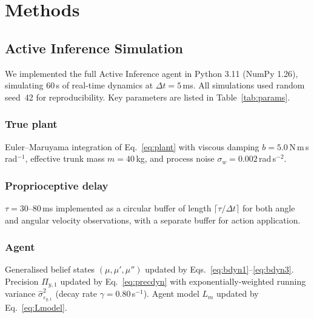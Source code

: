 \documentclass[12pt, letterpaper]{article}
\newcommand{\Piy}{\Pi_{y,1}}
\newcommand{\epsy}{\varepsilon_{y,1}}
\newcommand{\Lm}{L_m}
\begin{document}
\section{Methods}

\subsection{Active Inference Simulation}

We implemented the full Active Inference agent in Python 3.11 (NumPy 1.26),
simulating 60\,s of real-time dynamics at $\Delta t = 5$\,ms. All simulations
used random seed~42 for reproducibility. Key parameters are listed in
Table~\ref{tab:params}.

\subsubsection{True plant}
Euler--Maruyama integration of Eq.~\eqref{eq:plant} with viscous damping
$b = 5.0$\,N\,m\,s\,rad$^{-1}$, effective trunk mass $m = 40$\,kg, and process
noise $\sigma_w = 0.002$\,rad\,s$^{-2}$.

\subsubsection{Proprioceptive delay}
$\tau = 30$--$80$\,ms implemented as a circular buffer of length
$\lceil\tau/\Delta t\rceil$ for both angle and angular velocity observations,
with a separate buffer for action application.

\subsubsection{Agent}
Generalised belief states $(\mu, \mu', \mu'')$ updated by
Eqs.~\eqref{eq:bdyn1}--\eqref{eq:bdyn3}. Precision $\Piy$ updated by
Eq.~\eqref{eq:precdyn} with exponentially-weighted running variance
$\hat{\sigma}^{2}_{\epsy}$ (decay rate $\gamma = 0.80$\,s$^{-1}$). Agent
model $\Lm$ updated by Eq.~\eqref{eq:Lmodel}.
\end{document}

